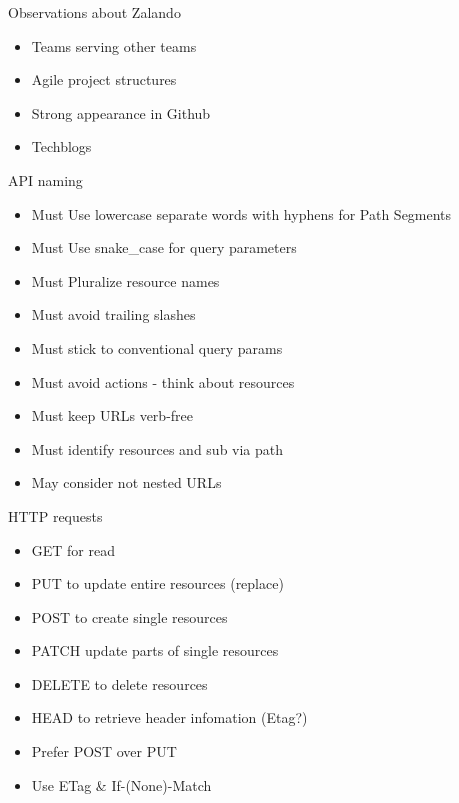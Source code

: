 \begin{frame}{Observations about Zalando}
\protect\hypertarget{observations-about-zalando}{}

\begin{itemize}
\tightlist
\item
  Teams serving other teams
\item
  Agile project structures
\item
  Strong appearance in Github
\item
  Techblogs
\end{itemize}

\end{frame}

\begin{frame}{API naming}
\protect\hypertarget{api-naming}{}

\begin{itemize}
\tightlist
\item
  Must Use lowercase separate words with hyphens for Path Segments
\item
  Must Use snake\_case for query parameters
\item
  Must Pluralize resource names
\item
  Must avoid trailing slashes
\item
  Must stick to conventional query params
\item
  Must avoid actions - think about resources
\item
  Must keep URLs verb-free
\item
  Must identify resources and sub via path
\item
  May consider not nested URLs
\end{itemize}

\end{frame}

\begin{frame}{HTTP requests}
\protect\hypertarget{http-requests}{}

\begin{itemize}
\tightlist
\item
  GET for read
\item
  PUT to update entire resources (replace)
\item
  POST to create single resources
\item
  PATCH update parts of single resources
\item
  DELETE to delete resources
\item
  HEAD to retrieve header infomation (Etag?)
\item
  Prefer POST over PUT
\item
  Use ETag \& If-(None)-Match
\end{itemize}

\end{frame}


